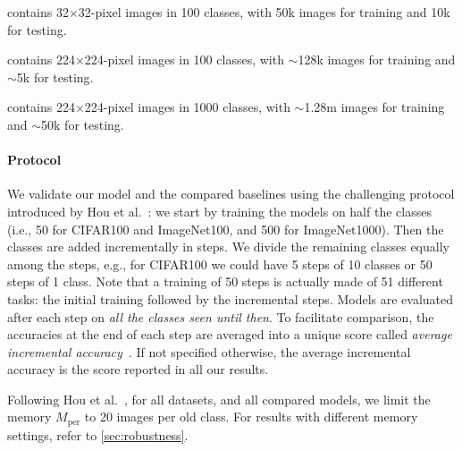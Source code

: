 {\begin{description} \setlength{\parskip}{0pt}
    \item[CIFAR100] contains 32$\times$32-pixel images in 100 classes, with 50k images for training
          and 10k for testing.
    \item[ImageNet100] contains 224$\times$224-pixel images in 100 classes, with $\sim$128k images
          for training and $\sim$5k for testing.
    \item[ImageNet1000] contains 224$\times$224-pixel images in 1000 classes, with $\sim$1.28m
          images for training and $\sim$50k for testing. \end{description}}

\paragraph{Protocol} We validate our model and the compared baselines using the challenging protocol
introduced by Hou et al.~\citep{hou2019ucir}: we start by training the models on half the classes
(i.e., 50 for CIFAR100 and ImageNet100, and 500 for ImageNet1000). Then the classes are added
incrementally in steps. We divide the remaining classes equally among the steps, e.g., for CIFAR100
we could have 5 steps of 10 classes or 50 steps of 1 class. Note that a training of 50 steps is
actually made of 51 different tasks: the initial training followed by the incremental steps. Models
are evaluated after each step on \textit{all the classes seen until then}. To facilitate comparison,
the accuracies at the end of each step are averaged into a unique score called \textit{average
    incremental accuracy}~\citep{rebuffi2017icarl}. If not specified otherwise, the average incremental
accuracy is the score reported in all our results.


Following Hou et al.~\citep{hou2019ucir}, for all datasets, and all compared models, we limit the
memory $M_\textrm{per}$ to 20 images per old class. For results with different memory settings,
refer to \autoref{sec:robustness}.

